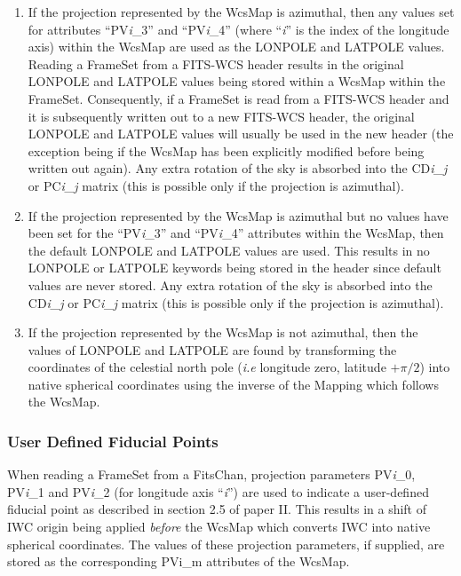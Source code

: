 \documentclass[twoside,11pt]{article}
\begin{document}
\begin{enumerate}

\item If the projection represented by the WcsMap is
azimuthal, then any values set for attributes ``PV\emph{i}\_3''
and ``PV\emph{i}\_4'' (where ``\emph{i}'' is the index of the longitude axis)
within the WcsMap are used as the LONPOLE and LATPOLE values. Reading a
FrameSet from a FITS-WCS header
results in the original LONPOLE and LATPOLE values being stored within a
WcsMap within the FrameSet. Consequently, if a FrameSet is read from a
FITS-WCS header and it is subsequently written out to a new FITS-WCS
header, the original LONPOLE and LATPOLE values will usually be used in
the new header (the exception being if the WcsMap has been explicitly
modified before being written out again). Any extra rotation of the sky
is absorbed into the CD\emph{i\_j} or PC\emph{i\_j} matrix (this is
possible only if the projection is azimuthal).

\item If the projection represented by the WcsMap is azimuthal but no
values have been set for the ``PV\emph{i}\_3'' and ``PV\emph{i}\_4''
attributes within the WcsMap, then the default LONPOLE and LATPOLE values
are used. This results in no LONPOLE or LATPOLE keywords being stored in
the header since default values are never stored. Any extra rotation of
the sky is absorbed into the CD\emph{i\_j} or PC\emph{i\_j} matrix (this
is possible only if the projection is azimuthal).

\item If the projection represented by the WcsMap is not azimuthal,
then the values of LONPOLE and LATPOLE are found by transforming the
coordinates of the celestial north pole (\emph{i.e} longitude zero,
latitude $+\pi/2$) into native spherical coordinates using the inverse of
the Mapping which follows the WcsMap.

\end{enumerate}

\subsubsection{User Defined Fiducial Points}
When reading a FrameSet from a FitsChan, projection parameters
PV\emph{i}\_0, PV\emph{i}\_1 and PV\emph{i}\_2 (for longitude axis
``\emph{i}'') are used to indicate a user-defined fiducial point as
described in section 2.5 of paper II. This results in a shift of IWC
origin being applied \emph{before} the WcsMap which converts
IWC into
native spherical coordinates. The values of these projection parameters,
if supplied, are stored as the corresponding PVi\_m attributes
of the WcsMap.
\end{document}
